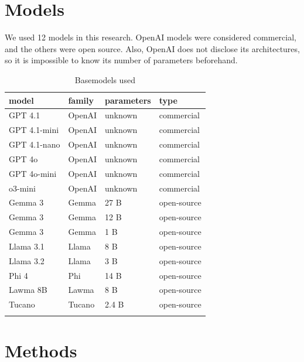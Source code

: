 \documentclass[
  12pt,
]{article}
\begin{document}
\section{Models}\label{models}

We used 12 models in this research. OpenAI models were considered
commercial, and the others were open source. Also, OpenAI does not
disclose its architectures, so it is impossible to know its number of
parameters beforehand.

\begin{longtable}[t]{llll}

\toprule
model & family & parameters & type\\
\midrule
GPT 4.1 & OpenAI & unknown & commercial\\
GPT 4.1-mini & OpenAI & unknown & commercial\\
GPT 4.1-nano & OpenAI & unknown & commercial\\
GPT 4o & OpenAI & unknown & commercial\\
GPT 4o-mini & OpenAI & unknown & commercial\\
\addlinespace
o3-mini & OpenAI & unknown & commercial\\
Gemma 3 & Gemma & 27 B & open-source\\
Gemma 3 & Gemma & 12 B & open-source\\
Gemma 3 & Gemma & 1 B & open-source\\
Llama 3.1 & Llama & 8 B & open-source\\
\addlinespace
Llama 3.2 & Llama & 3 B & open-source\\
Phi 4 & Phi & 14 B & open-source\\
Lawma 8B & Lawma & 8 B & open-source\\
Tucano & Tucano & 2.4 B & open-source\\
\bottomrule


\caption{\label{tbl-metadata}Basemodels used}

\tabularnewline
\end{longtable}

\section{Methods}\label{methods}
\end{document}
